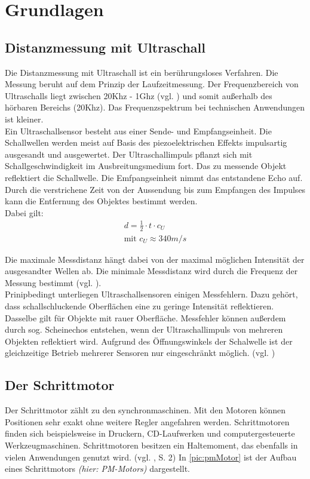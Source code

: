 \chapter{Grundlagen}
\section{Distanzmessung mit Ultraschall}
\label{sec:ultraschall}
Die Distanzmessung mit Ultraschall ist ein berührungsloses Verfahren. Die Messung  beruht auf dem Prinzip der Laufzeitmessung. Der Frequenzbereich von Ultraschalls liegt zwischen 20Khz - 1Ghz (vgl. \cite{ultraschallbereich}) und somit außerhalb des hörbaren Bereichs (20Khz).  Das Frequenzspektrum bei technischen Anwendungen ist kleiner. \\
Ein Ultraschallsensor besteht aus einer Sende- und Empfangseinheit. Die Schallwellen werden meist auf Basis des piezoelektrischen Effekts impulsartig ausgesandt und ausgewertet.  Der Ultraschallimpuls pflanzt sich mit Schallgeschwindigkeit im Ausbreitungsmedium fort. Das zu messende Objekt reflektiert die Schallwelle. Die Emfpangseinheit nimmt das entstandene Echo auf. Durch die verstrichene Zeit von der Aussendung bis zum Empfangen des Impulses kann die Entfernung des Objektes bestimmt werden. \\

Dabei gilt:
\begin{align}
d = \frac{1}{2} \cdot t\cdot c_U\\
\text{mit }  c_U \approx 340m/s 
\end{align}

\newpage
Die maximale Messdistanz hängt dabei von der maximal möglichen Intensität der ausgesandter Wellen ab. Die minimale Messdistanz wird durch die Frequenz der Messung bestimmt (vgl. \cite{ultraschallUni}). \\
Prinipbedingt unterliegen Ultraschallsensoren einigen Messfehlern. Dazu gehört, dass schallschluckende Oberflächen eine zu geringe Intensität reflektieren. Dasselbe gilt für Objekte mit rauer Oberfläche. Messfehler können außerdem durch sog. Scheinechos entstehen, wenn der Ultraschallimpuls von mehreren Objekten reflektiert wird. Aufgrund des Öffnungswinkels der Schalwelle ist der gleichzeitige Betrieb mehrerer Sensoren nur	 eingeschränkt möglich. (vgl. \cite{ultraschallBa})

\newpage
\section{Der Schrittmotor}
Der Schrittmotor zählt zu den \acrshort{synchronmaschine}n. Mit den Motoren können Positionen sehr exakt ohne weitere Regler angefahren werden. Schrittmotoren finden sich beispielsweise in Druckern, CD-Laufwerken und computergesteuerte Werkzeugmaschinen.  Schrittmotoren besitzen ein Haltemoment, das ebenfalls in vielen Anwendungen genutzt wird. (vgl. \cite{schrittmotorBa}, S. 2) In \autoref{pic:pmMotor} ist der Aufbau eines Schrittmotors \textit{(hier: PM-Motors)} dargestellt. 

